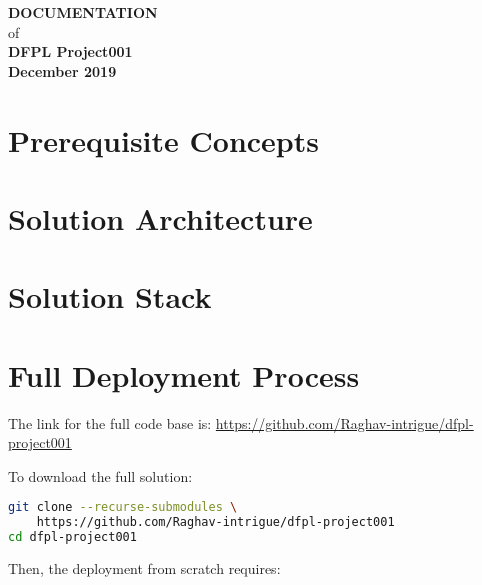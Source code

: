 \documentclass[a4paper,11pt,oneside]{book}
\newcommand{\ProjectTitle}{DFPL Project001}
\begin{document}
\begin{titlepage}
\begin{center}
\fontsize{28pt}{30pt}\selectfont
\textbf{DOCUMENTATION}\\[0.5cm]
\fontsize{20pt}{30pt}\selectfont
of\\[0.5cm]
\fontsize{32pt}{32pt}\selectfont
\textbf{\ProjectTitle}\\[14cm]
\fontsize{16pt}{18pt}\selectfont
\textbf{December 2019}
\end{center}
\end{titlepage}

\newpage
\tableofcontents

\newpage
\thispagestyle{empty}

\listoffigures

\listoftables

\mainmatter
\newpage

\chapter{Prerequisite Concepts}



\newpage
\chapter{Solution Architecture}


\chapter{Solution Stack}


\chapter{Full Deployment Process}

The link for the full code base is: \url{https://github.com/Raghav-intrigue/dfpl-project001}

\noindent
To download the full solution:

\begin{lstlisting}[tabsize=2,basicstyle=\footnotesize,language=bash,breaklines=true]
git clone --recurse-submodules \
	https://github.com/Raghav-intrigue/dfpl-project001
cd dfpl-project001
\end{lstlisting}

\noindent
Then, the deployment from scratch requires:
\end{document}
